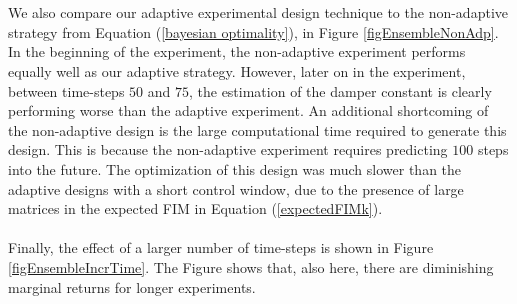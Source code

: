 \\
\\
We also compare our adaptive experimental design technique to the non-adaptive strategy from Equation (\ref{bayesian optimality}), in Figure \ref{figEnsembleNonAdp}. In the beginning of the experiment, the non-adaptive experiment performs equally well as our adaptive strategy. However, later on in the experiment, between time-steps $50$ and $75$, the estimation of the damper constant is clearly performing worse than the adaptive experiment. An additional shortcoming of the non-adaptive design is the large computational time required to generate this design. This is because the non-adaptive experiment requires predicting $100$ steps into the future. The optimization of this design was much slower than the adaptive designs with a short control window, due to the presence of large matrices in the expected FIM in Equation (\ref{expectedFIMk}).
\\
\\
Finally, the effect of a larger number of time-steps is shown in Figure \ref{figEnsembleIncrTime}. The Figure shows that, also here, there are diminishing marginal returns for longer experiments.
